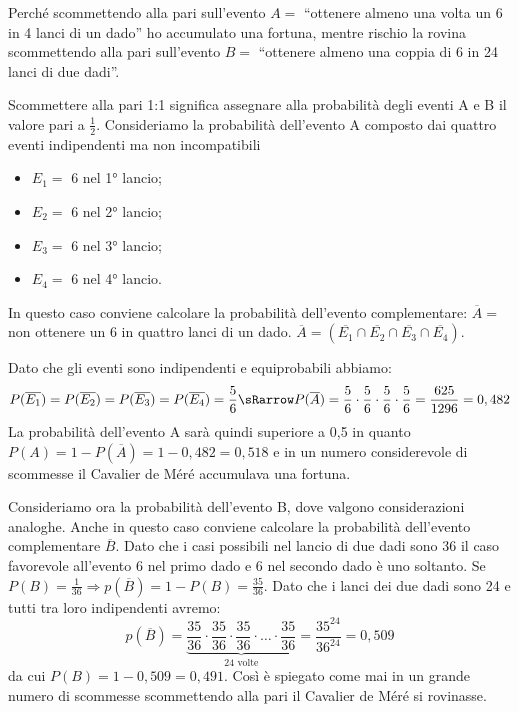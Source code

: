 \begin{problema}
Perché scommettendo alla pari sull'evento $ A= $ ``ottenere almeno una 
volta un 6 in 4 lanci di un dado'' ho accumulato una fortuna, mentre rischio 
la rovina scommettendo alla pari sull'evento $ B= $ ``ottenere almeno una 
coppia di 6 in 24 lanci di due dadi''.
\end{problema}
Scommettere alla pari 1:1 significa assegnare alla probabilità degli eventi 
A e 
B il valore pari a $\frac 1 2$.
Consideriamo la probabilità dell'evento A composto dai quattro eventi 
indipendenti ma non incompatibili
\begin{multicols}{2}
\begin{itemize} [nosep]

\item $ E_1= $  6 nel 1° lancio;
\item $ E_{2}= $  6 nel 2° lancio;
\item $ E_{3}= $  6 nel 3° lancio;
\item $ E_{4}= $  6 nel 4° lancio.
\end{itemize}
\end{multicols}
In questo caso conviene calcolare la probabilità dell'evento complementare: 
$\overline A=$ non ottenere un 6 in quattro lanci di un dado.
$\overline A=(\overline{E_1}\cap \overline{E_2}\cap \overline{E_3}\cap 
\overline{E_4})$.

Dato che gli eventi sono indipendenti e equiprobabili abbiamo: 
\[P(\overline{E_1})=P(\overline{E_2})=P(\overline{E_3})=P(\overline{E_4})=
  \frac{5}{6} \sRarrow 
  P(\overline A)=\frac 5 6\cdot \frac 5 6\cdot \frac 5 6\cdot \frac 5 6=
  \frac{625}{1296} = 0,482\] 
La probabilità dell'evento A sarà quindi superiore a 0,5 in quanto 
$P(A)=1-P(\overline A)=1-0,482=0,518$ e in un numero considerevole di 
scommesse il Cavalier de Méré accumulava una fortuna.

Consideriamo ora la probabilità dell'evento B, dove valgono considerazioni 
analoghe. Anche in questo caso conviene calcolare la probabilità 
dell'evento complementare $\overline B$. 
Dato che i casi possibili nel lancio di due 
dadi sono 36 il caso favorevole all'evento 6 nel primo dado e 6 nel secondo 
dado è uno soltanto. 
Se $P(B)=\frac 1{36} \Rightarrow p(\overline B)=1-P(B)=\frac{35}{36}$. 
Dato che i lanci dei due dadi sono 24 e tutti tra 
loro indipendenti avremo:
 \[ p(\overline 
B)=\underbrace{\frac{35}{36}\cdot\frac{35}{36}\cdot\frac{35}{36}
\cdot\ldots\cdot\frac{35}{36}}_{24\text{ 
volte}}=\frac{35^{24}}{36^{24}}=0,509 
\]
 da cui $P(B)=1-0,509=0,491$. Così è spiegato come mai in un grande numero 
di scommesse scommettendo alla pari il Cavalier de Méré si rovinasse.

